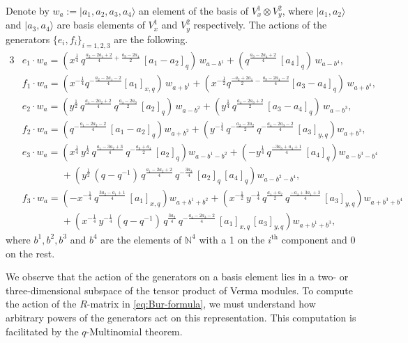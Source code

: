 \documentclass[12pt,oneside,reqno]{amsart}
\numberwithin{teorema}{section}
\numberwithin{definicion}{section}
\numberwithin{lema}{section}
\numberwithin{conjetura}{section}
\numberwithin{proposicion}{section}
\begin{document}
Denote by $w_a:=|a_1,a_2,a_3,a_4\rangle$ an element of the basis of $V_x^1\otimes V_y^2$, where $|a_1,a_2\rangle$ and $|a_3,a_4\rangle$ are basis elements of $V_x^1$ and $V_y^2$ respectively. The actions of the generators $\{e_i,f_i\}_{i=1,2,3}$ are the following.
\begin{alignat}{3}
    \label{eq:e1-action} &e_1\cdot w_a = \left(x^\frac14 \,q^{\frac{a_2-2a_1+2}{4}+\frac{a_3-2a_4}{2}}\,[a_1-a_2]_q \right)\,w_{a-b^1} + \left(q^\frac{a_3-2a_4+2}{4}\,[a_4]_q\right) \, w_{a-b^4}, \\
    &f_1 \cdot w_a = \left(x^{-\frac14}q^{-\frac{a_2-2a_1-2}{4}}[a_1]_{x,q}\right) \, w_{a+b^1} + \left( x^{-\frac12}q^{\frac{-a_2+2a_1}{2}-\frac{a_3-2a_4-2}{4}}[a_3-a_4]_q\right) \,w_{a+b^4}, \\
    &e_2 \cdot w_a = \left(y^\frac12\,q^{\frac{a_1-2a_2+2}{4}}\,q^{\frac{a_4-2a_3}{2}}\,[a_2]_q\right) \,w_{a-b^2}+\left(y^\frac14\,q^{\frac{a_4-2a_3+2}{2}}\,[a_3-a_4]_q\right) \,w_{a-b^3}, \\
    &f_2 \cdot w_a = \left(q^{-\frac{a_1-2a_2-2}{4}}\,[a_1-a_2]_q\right)w_{a+b^2}+\left(y^{-\frac14}\,q^{-\frac{a_2-2a_2}{2}}\,q^{-\frac{a_4-2a_3-2}{4}}\,[a_3]_{y,q}\right)w_{a+b^3}, \\
    &e_3 \cdot w_a = \left(x^{\frac14}\,y^\frac12\,q^{\frac{a_1-3a_2+3}{4}}\,q^{-\frac{a_3+a_4}{2}}\,[a_2]_q\right)w_{a-b^1-b^2}+\left(-y^\frac14\,q^{\frac{-3a_3+a_4+1}{4}}\,[a_4]_q\right)w_{a-b^3-b^4} \\
    &\hspace{4em}+\left(y^\frac12\,(q-q^{-1})\,q^{\frac{a_1-2a_2+2}{4}}\,q^{-\frac{3a_3}{4}}\,[a_2]_q\,[a_4]_q\right)w_{a-b^2-b^4}, \nonumber \\
    \label{eq:f3-action} &f_3\cdot w_a=\left(-x^{-\frac14}\,q^{\frac{3a_2-a_1+1}{4}}\,[a_1]_{x,q}\right)w_{a+b^1+b^2} +\left(x^{-\frac12}\,y^{-\frac14}\,q^{\frac{a_1+a_2}{2}}\,q^{\frac{-a_4+3a_1+3}{4}}\,[a_3]_{y,q}\right)w_{a+b^3+b^4} \\
    &\hspace{4em}+\left(x^{-\frac14}\,y^{-\frac14}\,(q-q^{-1})\,q^{\frac{3a_2}{4}}\,q^{-\frac{a_4-2a_3-2}{4}}\,[a_1]_{x,q}\,[a_3]_{y,q}\right)w_{a+b^1+b^3},\nonumber
\end{alignat}
where $b^1, b^2, b^3$ and $b^4$ are the elements of $\mathbb{N}^4$ with a 1 on the $i^{\text{th}}$ component and 0 on the rest.

We observe that the action of the generators on a basis element lies in a two- or three-dimensional subspace of the tensor product of Verma modules. To compute the action of the $R$-matrix in \eqref{eq:Bur-formula}, we must understand how arbitrary powers of the generators act on this representation. This computation is facilitated by the $q$-Multinomial theorem.
\end{document}
